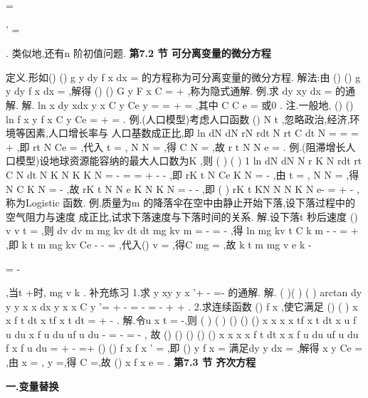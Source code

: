 =

'
=

. 
类似地,还有\textcolor{lyred}{n 阶初值问题}. 
\vspace{6pt}
{\large \bfseries \textcolor{lyred}{第7.2 节 可分离变量的微分方程}}

\textcolor{lyred}{定义}.形如()
()
g y dy
f x dx
=
的方程称为\textcolor{lyred}{可分离变量}的微分方程. 
\textcolor{lyred}{解法}:由
()
()
g y dy
f x dx
=
\int 
\int 
,解得
()
()
G y
F x
C
=
+
,称为\textcolor{lyred}{隐式通解}. 
\textcolor{lyred}{例}.求
dy
xy
dx =
的通解. 
解.
ln
x
dy
xdx
y
x
C
y
Ce
y =
\Rightarrow 
=
+
\Rightarrow 
=
\int 
\int 
,其中
C
C
e
=\pm 
或0 . 
\textcolor{lyred}{注}.一般地,
()
()
ln
f x
y
f x
C
y
Ce
=
+
\Rightarrow 
=
. 
\textcolor{lyred}{例}.(人口模型)考虑人口函数
()
N t ,忽略政治,经济,环境等因素,人口增长率与 
人口基数成正比,即
ln
dN
dN
rN
rdt
N
rt
C
dt
N
=
\Rightarrow 
=
\Rightarrow 
=
+
\int 
\int 
,即
rt
N
Ce
=
,代入 
t =
,
N
N
=
,得
C
N
=
,故
r t
N
N e \cdots 
=
. 
\textcolor{lyred}{例}.(阻滞增长人口模型)设地球资源能容纳的最大人口数为K ,则 
(
)
(
)
1 ln
dN
dN
N
r K
N
rdt
rt
C
N dt
N K
N
K
K
N
=
-
\Rightarrow 
=
\Rightarrow 
=
+
-
-
\int 
\int 
,即 
rK t
N
Ce
K
N
\cdots 
=
-
,由
t =
,
N
N
=
,得
N
C
K
N
=
-
,故
rK t
N
N
e
K
N
K
N
\cdots 
=
-
-
,即 
(
)
rK t
KN
N
N
K
N
e-
\cdots 
=
+
-
,称为\textcolor{lyred}{Logistic 函数}. 
\textcolor{lyred}{例}.质量为m 的降落伞在空中由静止开始下落,设下落过程中的空气阻力与速度 
成正比,试求下落速度与下落时间的关系. 
解.设下落t 秒后速度
()
v
v t
=
,则
dv
dv
m
mg
kv
dt
dt
mg
kv
m
=
-
\Rightarrow 
=
-
\int 
\int 
,得 
ln mg
kv
t
C
k
m
-
-
=
+
,即
k t
m
mg
kv
Ce
-
\cdots 
-
=
,代入()
v
=
,得C
mg
=
,故 
k t
m
mg
v
e
k
-
\cdots 


=
-




,当t \to +\infty 时,
mg
v
k
\approx 
. 
\textcolor{lyred}{补充练习} 
1.求
y
xy
y
x
'+
-
=-
的通解. 
解.
(
)(
)
(
)
arctan
dy
y
y
x
x dx
y
x
x
C
y
'=
+
-
\Rightarrow 
=
-
\Rightarrow 
=
-
+
+
. 
2.求连续函数
()
f x ,使它满足
()
(
)
x
x
f t dt
x
tf x
t dt
=
+
-
\int 
\int 
. 
解.令u
x
t
=
-,则
(
)
(
)
()
()
()
x
x
x
x
tf x
t dt
x
u f u du
x
f u du
uf u du
-
=
-
=
-
\int 
\int 
\int 
\int 
, 
故
()
()
()
()
()
x
x
x
x
f t dt
x
x
f u du
uf u du
f x
f u du
=
+
-
\Rightarrow 
=+
\Rightarrow 
\int 
\int 
\int 
\int 
()
()
f
x
f x
'
=
,即
()
y
f x
=
满足dy
y
dx =
,解得
x
y
Ce
=
,由
x =
,
y =,得
C =,故 
()
x
f x
e
=
. 
\vspace{6pt}
{\large \bfseries \textcolor{lyred}{第7.3 节 齐次方程}}

\vspace{4pt}
{\bfseries \textcolor{lyred}{一.变量替换}}

